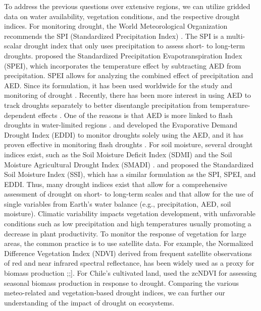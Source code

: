 \documentclass[
  authoryear,
  preprint,
  3p,
  onecolumn]{elsarticle}
\begin{document}
To address the previous questions over extensive regions, we can utilize
gridded data on water availability, vegetation conditions, and the
respective drought indices. For monitoring drought, the World
Meteorological Organization recommends the SPI (Standardized
Precipitation Index) \citep{WMO2012}. The SPI is a multi-scalar drought
index that only uses precipitation to assess short- to long-term
droughts. \citet{Vicente-Serrano2010} proposed the Standardized
Precipitation Evapotranspiration Index (SPEI), which incorporates the
temperature effect by subtracting AED from precipitation. SPEI allows
for analyzing the combined effect of precipitation and AED. Since its
formulation, it has been used worldwide for the study and monitoring of
drought \citep{Gebrechorkos2023, Liu2024}. Recently, there has been more
interest in using AED to track droughts separately to better disentangle
precipitation from temperature-dependent effects
\citep{Vicente-Serrano2020}. One of the reasons is that AED is more
linked to flash droughts in water-limited regions \citep{Noguera2022}.
\citet{Hobbins2016} and \citet{McEvoy2016} developed the Evaporative
Demand Drought Index (EDDI) to monitor droughts solely using the AED,
and it has proven effective in monitoring flash droughts
\citep{Li2024, Ford2023}. For soil moisture, several drought indices
exist, such as the Soil Moisture Deficit Index (SDMI)
\citep{Narasimhan2005} and the Soil Moisture Agricultural Drought Index
(SMADI) \citep{Souza2021}. \citet{Hao2013} and \citet{AghaKouchak2014}
proposed the Standardized Soil Moisture Index (SSI), which has a similar
formulation as the SPI, SPEI, and EDDI. Thus, many drought indices exist
that allow for a comprehensive assessment of drought on short- to
long-term scales and that allow for the use of single variables from
Earth's water balance (e.g., precipitation, AED, soil moisture).
Climatic variability impacts vegetation development, with unfavorable
conditions such as low precipitation and high temperatures usually
promoting a decrease in plant productivity. To monitor the response of
vegetation for large areas, the common practice is to use satellite
data. For example, the Normalized Difference Vegetation Index (NDVI)
derived from frequent satellite observations of red and near infrared
spectral reflectance, has been widely used as a proxy for biomass
production
\citet{Camps-Valls2021};\citet{Paruelo2016};\citet{Helman2014}{]}. For
Chile's cultivated land, \citet{Zambrano2018} used the zcNDVI for
assessing seasonal biomass production in response to drought. Comparing
the various meteo-related and vegetation-based drought indices, we can
further our understanding of the impact of drought on ecosystems.
\end{document}
